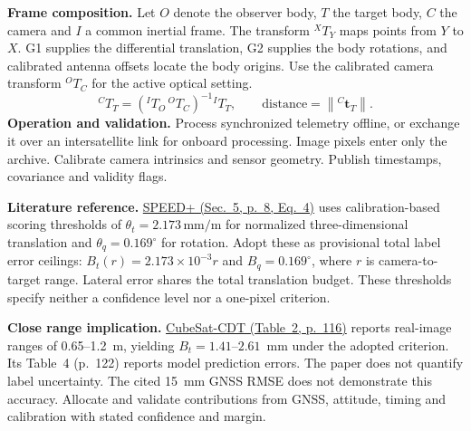 \documentclass[10pt,a4paper,landscape]{article}
\begin{document}
\begin{minipage}{\linewidth}
\footnotesize
\textbf{Frame composition.} Let $O$ denote the observer body, $T$ the target body, $C$ the camera and $I$ a common inertial frame. The transform ${}^{X}\!T_Y$ maps points from $Y$ to $X$. G1 supplies the differential translation, G2 supplies the body rotations, and calibrated antenna offsets locate the body origins. Use the calibrated camera transform ${}^{O}\!T_C$ for the active optical setting.
\[
{}^{C}\!T_T = \left({}^{I}\!T_O\,{}^{O}\!T_C\right)^{-1}{}^{I}\!T_T,
\qquad
\text{distance} = \left\|{}^{C}\!\mathbf t_T\right\|.
\]
\textbf{Operation and validation.} Process synchronized telemetry offline, or exchange it over an intersatellite link for onboard processing. Image pixels enter only the archive. Calibrate camera intrinsics and sensor geometry. Publish timestamps, covariance and validity flags.\par
\smallskip
\textbf{Literature reference.} \href{https://doi.org/10.1109/AERO53065.2022.9843439}{SPEED+ (Sec.~5, p.~8, Eq.~4)} uses calibration-based scoring thresholds of $\theta_t=2.173\,\mathrm{mm/m}$ for normalized three-dimensional translation and $\theta_q=0.169^\circ$ for rotation. Adopt these as provisional total label error ceilings: $B_t(r)=2.173\times10^{-3}r$ and $B_q=0.169^\circ$, where $r$ is camera-to-target range. Lateral error shares the total translation budget. These thresholds specify neither a confidence level nor a one-pixel criterion.\par
\smallskip
\textbf{Close range implication.} \href{https://doi.org/10.1007/978-3-031-25056-9_8}{CubeSat-CDT (Table~2, p.~116)} reports real-image ranges of 0.65--1.2~m, yielding $B_t=1.41$--$2.61$~mm under the adopted criterion. Its Table~4 (p.~122) reports model prediction errors. The paper does not quantify label uncertainty. The cited 15~mm GNSS RMSE does not demonstrate this accuracy. Allocate and validate contributions from GNSS, attitude, timing and calibration with stated confidence and margin.
\end{minipage}
\end{document}
